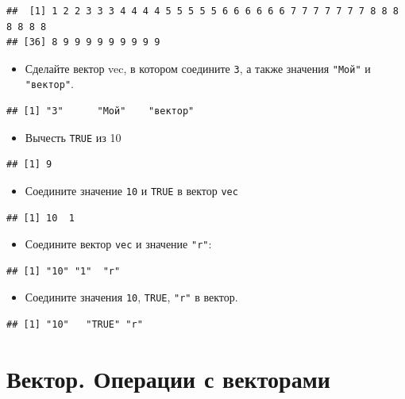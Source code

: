 \documentclass[]{book}
\providecommand{\tightlist}{%
  \setlength{\itemsep}{0pt}\setlength{\parskip}{0pt}}
\begin{document}
\begin{verbatim}
##  [1] 1 2 2 3 3 3 4 4 4 4 5 5 5 5 5 6 6 6 6 6 6 7 7 7 7 7 7 7 8 8 8 8 8 8 8
## [36] 8 9 9 9 9 9 9 9 9 9
\end{verbatim}

\begin{itemize}
\tightlist
\item
  Сделайте вектор vec, в котором соедините \texttt{3}, а также значения \texttt{"Мой"} и \texttt{"вектор"}.
\end{itemize}

\begin{verbatim}
## [1] "3"      "Мой"    "вектор"
\end{verbatim}

\begin{itemize}
\tightlist
\item
  Вычесть \texttt{TRUE} из 10
\end{itemize}

\begin{verbatim}
## [1] 9
\end{verbatim}

\begin{itemize}
\tightlist
\item
  Соедините значение \texttt{10} и \texttt{TRUE} в вектор \texttt{vec}
\end{itemize}

\begin{verbatim}
## [1] 10  1
\end{verbatim}

\begin{itemize}
\tightlist
\item
  Соедините вектор \texttt{vec} и значение \texttt{"r"}:
\end{itemize}

\begin{verbatim}
## [1] "10" "1"  "r"
\end{verbatim}

\begin{itemize}
\tightlist
\item
  Соедините значения \texttt{10}, \texttt{TRUE}, \texttt{"r"} в вектор.
\end{itemize}

\begin{verbatim}
## [1] "10"   "TRUE" "r"
\end{verbatim}

\hypertarget{vec_op}{%
\section{Вектор. Операции с векторами}\label{vec_op}}
\end{document}
